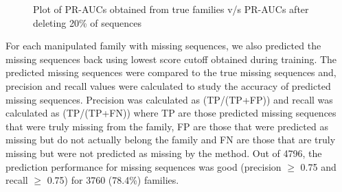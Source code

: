 \documentclass{article}
\begin{document}
		\begin{figure}
			\caption{Plot of PR-AUCs obtained from true families v/s PR-AUCs after deleting 20\% of sequences}
			\label{fig:scatter_pr-auc_true_vs_pr-auc_delete_ygob}
		\end{figure}
	
		For each manipulated family with missing sequences, we also predicted the missing sequences back using lowest score cutoff obtained during training. The predicted missing sequences were compared to the true missing sequences and, precision and recall values were calculated to study the accuracy of predicted missing sequences. Precision was calculated as (TP/(TP+FP)) and recall was calculated as (TP/(TP+FN)) where TP are those predicted missing sequences that were truly missing from the family, FP are those that were predicted as missing but do not actually belong the family and FN are those that are truly missing but were not predicted as missing by the method. Out of 4796, the prediction performance for missing sequences was good (precision $\geq$ 0.75 and recall $\geq$ 0.75) for 3760 (78.4\%) families.
		
\end{document}
